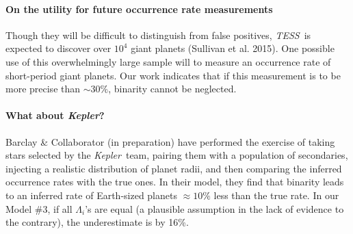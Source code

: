 \paragraph{On the utility for future occurrence rate measurements}
Though they will be difficult to distinguish from false positives, {\it TESS}\ 
is expected to discover over $10^4$ giant planets (Sullivan et al. 2015).
One possible use of this overwhelmingly large sample will to measure an
occurrence rate of short-period giant planets.
Our work indicates that if this measurement is to be more precise than $\sim 
30\%$, binarity cannot be neglected.


\paragraph{What about {\it Kepler}?}
Barclay \& Collaborator (in preparation) have performed the exercise 
of taking stars selected by the {\it Kepler}\ team, pairing them with a 
population of secondaries, injecting a realistic distribution of planet radii, 
and then comparing the inferred occurrence rates with the true ones.
In their model, they find that binarity leads to an inferred rate of 
Earth-sized planets $\approx 10\%$ less than the true rate.
In our Model \#3, if all $\Lambda_i$'s are equal (a plausible assumption in 
the lack of evidence to the contrary), the underestimate is by 16\%.
